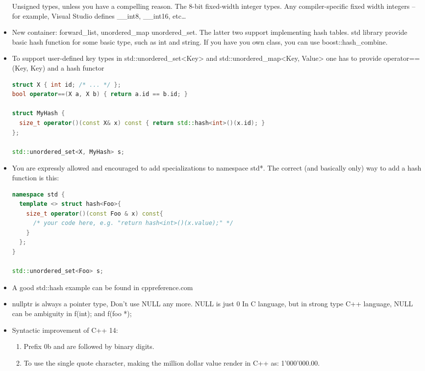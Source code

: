 \documentclass[a4paper,12pt,twoside]{book}
\begin{document}
\begin{itemize}
Unsigned types, unless you have a compelling reason.
The 8-bit fixed-width integer types.
Any compiler-specific fixed width integers -- for example, Visual Studio defines \_\_int8, \_\_int16, etc…


\item New container: forward\_list, unordered\_map unordered\_set.  The latter two support implementing hash tables. std library provide basic hash function for some basic type, such as int and string. If you have you own class, you can use boost::hash\_combine. 

\item To support user-defined key types in std::unordered\_set<Key> and std::unordered\_map<Key, Value> one has to provide operator==(Key, Key) and a hash functor
\begin{lstlisting}[frame=single, language=c++]
struct X { int id; /* ... */ };
bool operator==(X a, X b) { return a.id == b.id; }

struct MyHash {
  size_t operator()(const X& x) const { return std::hash<int>()(x.id); }
};

std::unordered_set<X, MyHash> s;
\end{lstlisting}

\item You are expressly allowed and encouraged to add specializations to namespace std*. The correct (and basically only) way to add a hash function is this:
\begin{lstlisting}[frame=single, language=c++]
namespace std {
  template <> struct hash<Foo>{
    size_t operator()(const Foo & x) const{
      /* your code here, e.g. "return hash<int>()(x.value);" */
    }
  };
}

std::unordered_set<Foo> s;
\end{lstlisting}
\item A good std::hash example can be found in cppreference.com 

\item nullptr is always a pointer type, Don't use NULL any more. NULL is just 0 In C language, but in strong type C++ language, NULL can be ambiguity in f(int); and f(foo *);

\item Syntactic improvement of C++ 14:
\begin{enumerate}
\item Prefix 0b and are followed by binary digits.
\item To use the single quote character, making the million dollar value render in C++ as: 1'000'000.00.
\end{enumerate}


\end{itemize}
\end{document}
